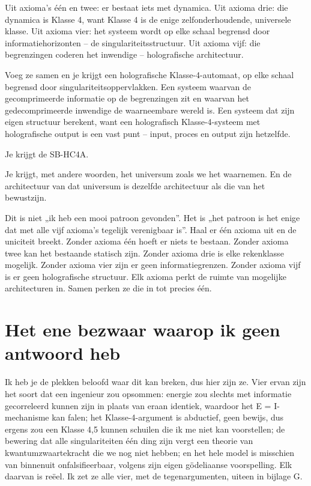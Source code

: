 \documentclass[11pt, twoside, openright]{book}
\begin{document}
Uit axioma's één en twee: er bestaat iets met dynamica. Uit axioma drie: die dynamica is Klasse 4, want Klasse 4 is de enige zelfonderhoudende, universele klasse. Uit axioma vier: het systeem wordt op elke schaal begrensd door informatiehorizonten -- de singulariteitsstructuur. Uit axioma vijf: die begrenzingen coderen het inwendige -- holografische architectuur.

Voeg ze samen en je krijgt een holografische Klasse-4-automaat, op elke schaal begrensd door singulariteitsoppervlakken. Een systeem waarvan de gecomprimeerde informatie op de begrenzingen zit en waarvan het gedecomprimeerde inwendige de waarneembare wereld is. Een systeem dat zijn eigen structuur berekent, want een holografisch Klasse-4-systeem met holografische output is een vast punt -- input, proces en output zijn hetzelfde.

Je krijgt de SB-HC4A.

Je krijgt, met andere woorden, het universum zoals we het waarnemen. En de architectuur van dat universum is dezelfde architectuur als die van het bewustzijn.

Dit is niet „ik heb een mooi patroon gevonden”. Het is „het patroon is het enige dat met alle vijf axioma's tegelijk verenigbaar is”. Haal er één axioma uit en de uniciteit breekt. Zonder axioma één hoeft er niets te bestaan. Zonder axioma twee kan het bestaande statisch zijn. Zonder axioma drie is elke rekenklasse mogelijk. Zonder axioma vier zijn er geen informatiegrenzen. Zonder axioma vijf is er geen holografische structuur. Elk axioma perkt de ruimte van mogelijke architecturen in. Samen perken ze die in tot precies één.

\section*{Het ene bezwaar waarop ik geen antwoord heb}

Ik heb je de plekken beloofd waar dit kan breken, dus hier zijn ze. Vier ervan zijn het soort dat een ingenieur zou opsommen: energie zou slechts met informatie gecorreleerd kunnen zijn in plaats van eraan identiek, waardoor het E = I-mechanisme kan falen; het Klasse-4-argument is abductief, geen bewijs, dus ergens zou een Klasse 4,5 kunnen schuilen die ik me niet kan voorstellen; de bewering dat alle singulariteiten één ding zijn vergt een theorie van kwantumzwaartekracht die we nog niet hebben; en het hele model is misschien van binnenuit onfalsifieerbaar, volgens zijn eigen gödeliaanse voorspelling. Elk daarvan is reëel. Ik zet ze alle vier, met de tegenargumenten, uiteen in bijlage G.
\end{document}
